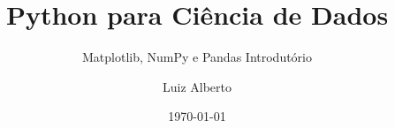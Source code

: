 \documentclass[t, final, 12pt, xcolor={usenames,dvipsnames}, table]{beamer}
\author{Luiz Alberto}
\title{Python para Ciência de Dados}
\subtitle{Matplotlib, NumPy e Pandas Introdutório}
\institute{Ciência da Computação}
\date{\today}
\begin{document}
  
  \begin{frame}[t,plain]
    \titlepage
  \end{frame}
  
  
  
  
  
  
  
  
  

  
  
  
  
\end{document}
